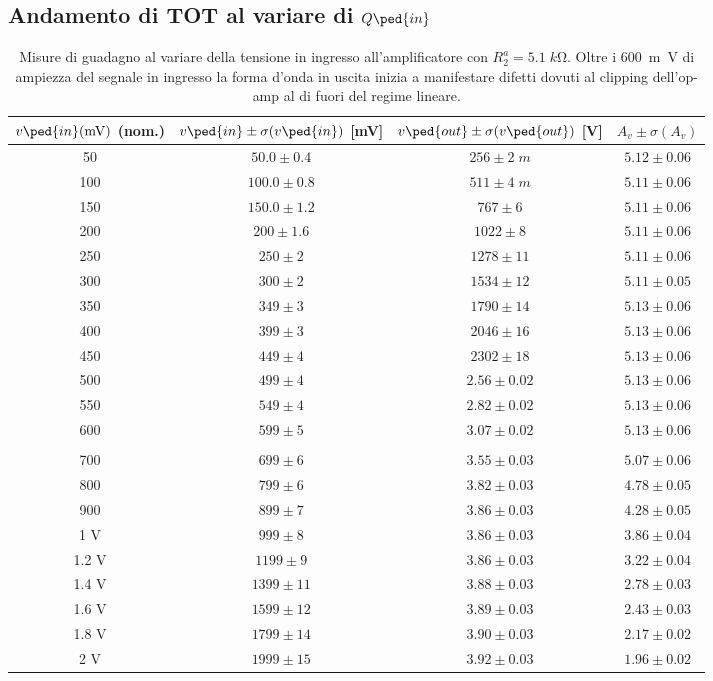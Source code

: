 \documentclass[10pt,a4paper]{article}
\begin{document}
\subsection{Andamento di TOT al variare di $Q\ped{in}$}
\begin{table}[htbp]
\centering
\begin{tabular}{cccc}
\toprule
$v\ped{in}(\si{m\V})$ (nom.) & $v\ped{in} \pm \sigma(v\ped{in})$ [mV] & 
$v\ped{out} \pm \sigma(v\ped{out})$ [V] & $A_v \pm \sigma(A_v)$ \\
\midrule
\midrule
50 & $50.0 \pm 0.4$ & $256 \pm 2 \; \si{m}$ & $5.12 \pm 0.06$ \\
100 & $100.0 \pm 0.8$ & $511 \pm 4 \; \si{m}$ & $5.11 \pm 0.06$ \\
150 & $150.0 \pm 1.2$ & $767 \pm 6$ & $5.11 \pm 0.06$ \\
200 & $200 \pm 1.6$ & $1022 \pm 8$ & $5.11 \pm 0.06$ \\
250 & $250 \pm 2$ & $1278 \pm 11$ & $5.11 \pm 0.06$ \\
300 & $300 \pm 2$ & $1534 \pm 12$ & $5.11 \pm 0.05$ \\
350 & $349 \pm 3$ & $1790 \pm 14$ & $5.13 \pm 0.06$ \\
400 & $399 \pm 3$ & $2046 \pm 16$ & $5.13 \pm 0.06$ \\
450 & $449 \pm 4$ & $2302 \pm 18$ & $5.13 \pm 0.06$ \\
500 & $499 \pm 4$ & $2.56 \pm 0.02$ & $5.13 \pm 0.06$ \\
550 & $549 \pm 4$ & $2.82 \pm 0.02$ & $5.13 \pm 0.06$ \\
600 & $599 \pm 5$ & $3.07 \pm 0.02$ & $5.13 \pm 0.06$ \\
\\
700 & $699 \pm 6$ & $3.55 \pm 0.03$ & $5.07 \pm 0.06$ \\
800 & $799 \pm 6$ & $3.82 \pm 0.03$ & $4.78 \pm 0.05$ \\
900 & $899 \pm 7$ & $3.86 \pm 0.03$ & $4.28 \pm 0.05$ \\
1 V & $999 \pm 8$ & $3.86 \pm 0.03$ & $3.86 \pm 0.04$ \\
1.2 V & $1199 \pm 9$ & $3.86 \pm 0.03$ & $3.22 \pm 0.04$ \\
1.4 V & $1399 \pm 11$ & $3.88 \pm 0.03$ & $2.78 \pm 0.03$ \\
1.6 V & $1599 \pm 12$ & $3.89 \pm 0.03$ & $2.43 \pm 0.03$ \\
1.8 V & $1799 \pm 14$ & $3.90 \pm 0.03$ & $2.17 \pm 0.02$ \\
2 V & $1999 \pm 15$ & $3.92 \pm 0.03$ & $1.96 \pm 0.02$ \\
\bottomrule
\end{tabular} 
\caption{Misure di guadagno al variare della tensione in ingresso
all'amplificatore con $R_2^a = 5.1 \; \si{k\ohm}$. Oltre i \SI{600}{m\V} di
ampiezza del segnale in ingresso la forma d'onda in uscita inizia a
manifestare difetti dovuti al clipping dell'op-amp al di fuori del regime
lineare. \label{tab: gain_B}}
\end{table}
\end{document}
